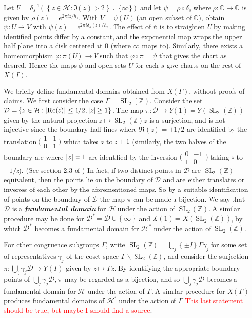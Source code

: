 \documentclass[10pt,leqno,twoside]{article}
\theoremstyle{plain}
\theoremstyle{definition}
\numberwithin{equation}{section}
\numberwithin{lem}{section}
\newcommand{\cbr}[1]{\left\{#1\right\}}
\newcommand{\textib}[1]{\textbf{\textit{#1\index{#1}}}} %
\DeclareMathOperator{\SL}{SL}
\newcommand{\slz}{\SL_2(\mathbb{Z})}
\newcommand{\sai}[1]{\textcolor{red}{#1}}
\begin{document}
Let $U = \delta_s^{-1}(\cbr{z\in\mathcal H : \Im(z) > 2}\cup\{\infty\})$ and let $\psi = \rho\circ \delta_s$ where $\rho\colon \mathbb C\to\mathbb C$ is given by $\rho(z) = e^{2\pi i z/h_s}$. With $V = \psi(U)$ (an open subset of $\mathbb C$), obtain $\psi\colon U\to V$ with $\psi(z) = e^{2\pi i \delta_s(z)/h_s}$. The effect of $\psi$ is to straighten $U$ by making identified points differ by a constant, and the exponential map wraps the upper half plane into a disk centered at $0$ (where $\infty$ maps to). Similarly, there exists a homeomorphism $\varphi\colon \pi(U)\to V$ such that $\varphi\circ\pi = \psi$ that gives the chart as desired. Hence the maps $\phi$ and open sets $U$ for each $s$ give charts on the rest of $X(\varGamma)$.

We briefly define fundamental domains obtained from $X(\varGamma)$, without proofs of claims. We first consider the case $\varGamma = \slz$. Consider the set $\mathcal D = \cbr{z\in\mathcal H : \abs{\Re(z)}\leq 1/2,\abs{z}\geq 1}$. The map $\pi\colon\mathcal D\to Y(1) = Y(\slz)$ given by the natural projection $z\mapsto \slz z$ is a surjection, and is not injective since the boundary half lines where $\Re(z) = \pm 1/2$ are identified by the translation $\big(\!\begin{smallmatrix}
    1 & 1 \\ 0 & 1
\end{smallmatrix}\!\big)$ which takes $z$ to $z+1$ (similarly, the two halves of the boundary arc where $\abs{z} = 1$ are identified by the inversion $\big(\!\begin{smallmatrix}
    0 & -1 \\ 1 & 0
\end{smallmatrix}\!\big)$ taking $z$ to $-1/z$). (See section 2.3 of \cite{diamond}) In fact, if two distinct points in $\mathcal D$ are $\slz$-equivalent, then the points lie on the boundary of $\mathcal D$ and are either translates or inverses of each other by the aforementioned maps. So by a suitable identification of points on the boundary of $\mathcal D$ the map $\pi$ can be made a bijection. We say that $\mathcal D$ is a \textib{fundamental domain} for $\mathcal H$ under the action of $\slz$. A similar procedure may be done for $\mathcal D^\ast = \mathcal D \cup\cbr{\infty}$ and $X(1) = X(\slz)$, by which $\mathcal D^\ast$ becomes a fundamental domain for $\mathcal H^\ast$ under the action of $\slz$. 

For other congruence subgroups $\varGamma$, write $\slz = \bigcup_j \cbr{\pm I}\varGamma \gamma_j$ for some set of representatives $\gamma_j$ of the coset space $\varGamma\backslash \slz$, and consider the surjection $\pi\colon \bigcup_j \gamma_j\mathcal D\to Y(\varGamma)$ given by $z\mapsto \varGamma z$. By identifying the appropriate boundary points of $\bigcup_j \gamma_j\mathcal D$, $\pi$ may be regarded as a bijection, and so $\bigcup_j \gamma_j\mathcal D$ becomes a fundamental domain for $\mathcal H$ under the action of $\varGamma$. A similar procedure for $X(\varGamma)$ produces fundamental domains of $\mathcal H^\ast$ under the action of $\varGamma$ \sai{This last statement should be true, but maybe I should find a source}. 
\end{document}
